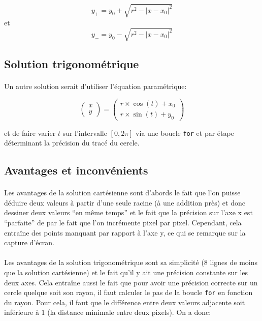 \documentclass{report}
\begin{document}
\begin{equation}
	y_+ = y_0 + \sqrt{r^2 - {\left|x-x_0\right|}^2}
	\label{progcerclpos}
\end{equation}
et
\begin{equation}
	y_- = y_0 - \sqrt{r^2 - {\left|x-x_0\right|}^2}
	\label{progcerclneg}
\end{equation}

\subsection{Solution trigonométrique}

\paragraph{} Un autre solution serait d'utiliser l'équation paramétrique:

\begin{equation}
	\begin{pmatrix}
		x\\y
	\end{pmatrix}
	=
	\begin{pmatrix}
		r\times\cos(t) + x_0\\
		r\times\sin(t) + y_0
	\end{pmatrix}
	\label{param}
\end{equation}

et de faire varier $t$ sur l'intervalle $\left[0,2\pi\right]$ via une boucle
\lstinline[style=prog]|for| et par étape déterminant la précision du tracé du
cercle.

\subsection{Avantages et inconvénients}

\paragraph{} Les avantages de la solution cartésienne sont d'abords le fait que
l'on puisse déduire deux valeurs à partir d'une seule racine (à une addition
près) et donc dessiner deux valeurs ``en même temps'' et le fait que la
précision sur l'axe x est ``parfaite'' de par le fait que l'on incrémente pixel
par pixel. Cependant, cela entraîne des points manquant par rapport à l'axe y,
ce qui se remarque sur la capture d'écran.

\paragraph{} Les avantages de la solution trigonométrique sont sa simplicité (8
lignes de moins que la solution cartésienne) et le fait qu'il y ait une
précision constante sur les deux axes. Cela entraîne aussi le fait que pour
avoir une précision correcte sur un cercle quelque soit son rayon, il faut
calculer le pas de la boucle \lstinline[style=prog]|for| en fonction du rayon.
Pour cela, il faut que le différence entre deux valeurs adjacente soit
inférieure à $1$ (la distance minimale entre deux pixels). On a donc:
\end{document}
